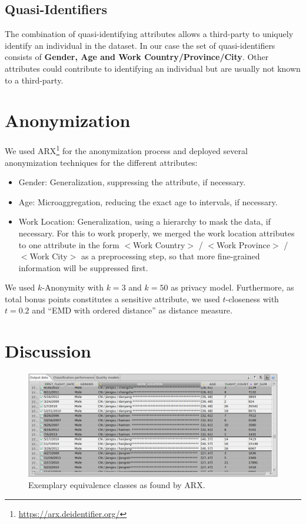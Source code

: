 \documentclass[parskip=full]{scrartcl}
\begin{document}
\subsection{Quasi-Identifiers}
The combination of quasi-identifying attributes allows a third-party to uniquely identify an individual in the dataset. In our case the set of quasi-identifiers consists of \textbf{Gender, Age and Work Country/Province/City}. Other attributes could contribute to identifying an individual but are usually not known to a third-party.

\section{Anonymization}
We used ARX\footnote{\url{https://arx.deidentifier.org/}} for the anonymization process and deployed several anonymization techniques for the different attributes:
\begin{itemize}
\item Gender: Generalization, suppressing the attribute, if necessary.
\item Age: Microaggregation, reducing the exact age to intervals, if necessary.
\item Work Location: Generalization, using a hierarchy to mask the data, if necessary. For this to work properly, we merged the work location attributes to one attribute in the form $<$Work Country$>$ / $<$Work Province$>$ / $<$Work City$>$ as a preprocessing step, so that more fine-grained information will be suppressed first.
\end{itemize} 

We used $k$-Anonymity with $k=3$ and $k=50$ as privacy model. Furthermore, as total bonus points constitutes a sensitive attribute, we used $t$-closeness with $t=0.2$ and ``EMD with ordered distance'' as distance measure.

\section{Discussion}

\begin{figure}[t!]
\centering
\includegraphics[width=\textwidth]{figures/classes.png}
\caption{Exemplary equivalence classes as found by ARX.}
\label{fig:classes}
\end{figure}
\end{document}
